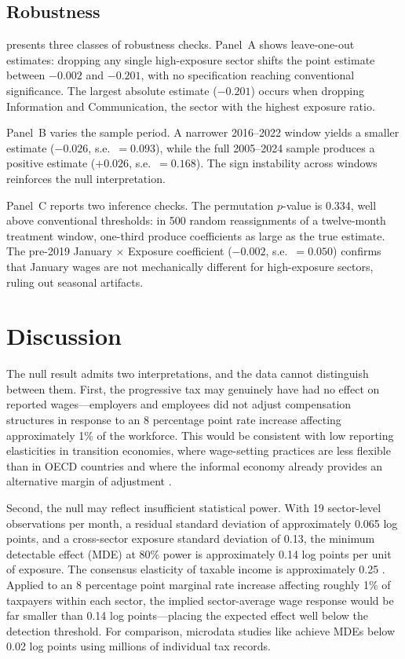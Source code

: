 \documentclass[12pt]{article}
\begin{document}
\subsection{Robustness}



 presents three classes of robustness checks. Panel~A shows leave-one-out estimates: dropping any single high-exposure sector shifts the point estimate between $-0.002$ and $-0.201$, with no specification reaching conventional significance. The largest absolute estimate ($-0.201$) occurs when dropping Information and Communication, the sector with the highest exposure ratio.

Panel~B varies the sample period. A narrower 2016--2022 window yields a smaller estimate ($-0.026$, s.e.~$= 0.093$), while the full 2005--2024 sample produces a positive estimate ($+0.026$, s.e.~$= 0.168$). The sign instability across windows reinforces the null interpretation.

Panel~C reports two inference checks. The permutation $p$-value is 0.334, well above conventional thresholds: in 500 random reassignments of a twelve-month treatment window, one-third produce coefficients as large as the true estimate. The pre-2019 January $\times$ Exposure coefficient ($-0.002$, s.e.~$= 0.050$) confirms that January wages are not mechanically different for high-exposure sectors, ruling out seasonal artifacts.

\section{Discussion}

The null result admits two interpretations, and the data cannot distinguish between them. First, the progressive tax may genuinely have had no effect on reported wages---employers and employees did not adjust compensation structures in response to an 8 percentage point rate increase affecting approximately 1\% of the workforce. This would be consistent with low reporting elasticities in transition economies, where wage-setting practices are less flexible than in OECD countries \citep{kleven2011unwilling} and where the informal economy already provides an alternative margin of adjustment \citep{gorodnichenko2009myth}.

Second, the null may reflect insufficient statistical power. With 19 sector-level observations per month, a residual standard deviation of approximately 0.065 log points, and a cross-sector exposure standard deviation of 0.13, the minimum detectable effect (MDE) at 80\% power is approximately 0.14 log points per unit of exposure. The consensus elasticity of taxable income is approximately 0.25 \citep{saez2012elasticity}. Applied to an 8 percentage point marginal rate increase affecting roughly 1\% of taxpayers within each sector, the implied sector-average wage response would be far smaller than 0.14 log points---placing the expected effect well below the detection threshold. For comparison, microdata studies like \citet{kleven2014estimating} achieve MDEs below 0.02 log points using millions of individual tax records.
\end{document}
